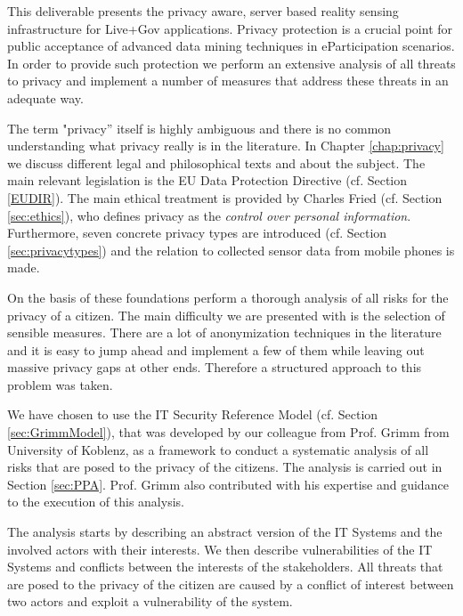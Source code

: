\documentclass[external]{20120615_deliverable_template_ukob}
\theoremstyle{definition}
\begin{document}
\begin{LGExecutiveSummary}
\vspace{10pt}

This deliverable presents the privacy aware, server based reality
sensing infrastructure for Live+Gov applications.  Privacy protection
is a crucial point for public acceptance of advanced data mining
techniques in eParticipation scenarios.  In order to provide such
protection we perform an extensive analysis of all threats to privacy
and implement a number of measures that address these threats in an
adequate way.

The term "privacy'' itself is highly ambiguous and there is no common
understanding what privacy really is in the literature.  In
Chapter \ref{chap:privacy} we discuss different legal and
philosophical texts and about the subject.  The main relevant
legislation is the EU Data Protection Directive (cf. Section
\ref{EUDIR}). The main ethical treatment is provided by Charles Fried
(cf. Section \ref{sec:ethics}), who defines privacy as the
\emph{control over personal information}. Furthermore, seven concrete
privacy types are introduced (cf. Section \ref{sec:privacytypes}) and
the relation to collected sensor data from mobile phones is made.

On the basis of these foundations perform a thorough analysis of all
risks for the privacy of a citizen. The main difficulty we are
presented with is the selection of sensible measures. There are a lot
of anonymization techniques in the literature and it is easy to jump
ahead and implement a few of them while leaving out massive privacy
gaps at other ends. Therefore a structured approach to this problem
was taken.

We have chosen to use the IT Security Reference Model
\cite{Grimm:ItSecRefModel} (cf. Section \ref{sec:GrimmModel}), that
was developed by our colleague from Prof. Grimm from University of
Koblenz, as a framework to conduct a systematic analysis of all risks
that are posed to the privacy of the citizens. The analysis is carried
out in Section \ref{sec:PPA}. Prof. Grimm also contributed with his
expertise and guidance to the execution of this analysis.

The analysis starts by describing an abstract version of the IT
Systems and the involved actors with their interests. We then describe
vulnerabilities of the IT Systems and conflicts between the interests
of the stakeholders. All threats that are posed to the privacy of the
citizen are caused by a conflict of interest between two actors and
exploit a vulnerability of the system.


\end{LGExecutiveSummary}
\end{document}
